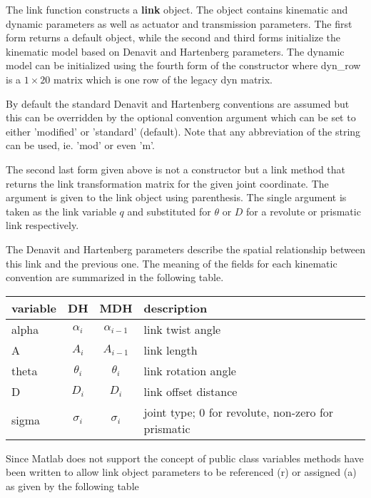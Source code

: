 \documentclass{article}
\newcommand{\mdes}[1]{\hskip -1.25in 
{\hbox{\makebox[1.25in][l]{\Refon Description}}}{#1}\vskip 0.25in}
\newcommand{\var}[1]{{\vtt #1}}
\begin{document}
\mdes{The \var{link} function constructs a \textbf{link} object.
The object contains kinematic and dynamic parameters as well as actuator and
transmission
parameters.
The first form returns a default object, while the second and third forms
initialize the kinematic model based on Denavit and Hartenberg parameters.
The dynamic model can be initialized using the fourth form of the constructor
where \var{dyn\_row} is a $1 \times 20$ matrix which is one row of the legacy
\var{dyn} matrix.

By default the standard Denavit and Hartenberg conventions are assumed but
this can be overridden by the optional \var{convention} argument which can
be set to either \var{'modified'} or \var{'standard'} (default).  Note
that any abbreviation of the string can be used, ie. \var{'mod'} or even
\var{'m'}.

The second last form given above is not a constructor but a link method that returns
the link transformation matrix for the given joint coordinate.
The argument is given to
the link object using parenthesis.  The single argument is taken as the link
variable $q$ and substituted for $\theta$ or $D$ for a revolute or prismatic
link respectively.

The  Denavit and Hartenberg parameters describe the spatial relationship between
this link and the previous one.  The meaning of the fields for each kinematic
convention are
summarized in the following table.

\begin{tabular}{lccl}
variable & DH & MDH & description \\ \hline
\var{alpha} & $\alpha_i$    & $\alpha_{i-1}$ & link twist angle \\
\var{A}     &  $A_i$        & $A_{i-1}$      & link length \\
\var{theta} &  $\theta_i$   & $\theta_i$     & link rotation angle \\
\var{D}     & $D_i$         & $D_i$          & link offset distance \\
\var{sigma} &  $\sigma_i$   & $\sigma_i$     & joint type; 0 for revolute, non-zero for prismatic \\
\end{tabular}


Since Matlab does not support the concept of public class variables methods have
been written to allow link object parameters to be referenced (r) or assigned
(a) as given by the following table
 
}
\end{document}
